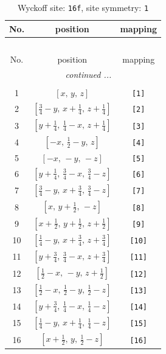 \documentclass[fleqn,8pt]{jsarticle}
\begin{document}
\begin{longtable}{ccc}
\caption{Wyckoff site: {\tt 16f}, site symmetry: {\tt 1}}
 \\
 \hline \hline
No. & position & mapping \\ \hline \endfirsthead

\multicolumn{2}{l}{\tablename\ \thetable{}} \\
 \hline \hline
No. & position & mapping \\ \hline \endhead

 \hline \hline
\multicolumn{2}{r}{\footnotesize\it continued ...} \\ \endfoot

 \hline \hline
\multicolumn{2}{r}{} \\ \endlastfoot

1 & $\left[ x,\, y,\, z \right]$ & {\tt [1]} \\ \hline
2 & $\left[ \frac{3}{4} - y,\, x + \frac{1}{4},\, z + \frac{1}{4} \right]$ & {\tt [2]} \\ \hline
3 & $\left[ y + \frac{1}{4},\, \frac{1}{4} - x,\, z + \frac{1}{4} \right]$ & {\tt [3]} \\ \hline
4 & $\left[ - x,\, \frac{1}{2} - y,\, z \right]$ & {\tt [4]} \\ \hline
5 & $\left[ - x,\, - y,\, - z \right]$ & {\tt [5]} \\ \hline
6 & $\left[ y + \frac{1}{4},\, \frac{3}{4} - x,\, \frac{3}{4} - z \right]$ & {\tt [6]} \\ \hline
7 & $\left[ \frac{3}{4} - y,\, x + \frac{3}{4},\, \frac{3}{4} - z \right]$ & {\tt [7]} \\ \hline
8 & $\left[ x,\, y + \frac{1}{2},\, - z \right]$ & {\tt [8]} \\ \hline
9 & $\left[ x + \frac{1}{2},\, y + \frac{1}{2},\, z + \frac{1}{2} \right]$ & {\tt [9]} \\ \hline
10 & $\left[ \frac{1}{4} - y,\, x + \frac{3}{4},\, z + \frac{3}{4} \right]$ & {\tt [10]} \\ \hline
11 & $\left[ y + \frac{3}{4},\, \frac{3}{4} - x,\, z + \frac{3}{4} \right]$ & {\tt [11]} \\ \hline
12 & $\left[ \frac{1}{2} - x,\, - y,\, z + \frac{1}{2} \right]$ & {\tt [12]} \\ \hline
13 & $\left[ \frac{1}{2} - x,\, \frac{1}{2} - y,\, \frac{1}{2} - z \right]$ & {\tt [13]} \\ \hline
14 & $\left[ y + \frac{3}{4},\, \frac{1}{4} - x,\, \frac{1}{4} - z \right]$ & {\tt [14]} \\ \hline
15 & $\left[ \frac{1}{4} - y,\, x + \frac{1}{4},\, \frac{1}{4} - z \right]$ & {\tt [15]} \\ \hline
16 & $\left[ x + \frac{1}{2},\, y,\, \frac{1}{2} - z \right]$ & {\tt [16]} \\
\end{longtable}
\end{document}

